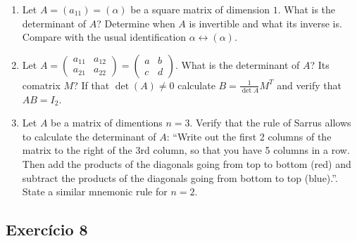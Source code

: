 \begin{enumerate}
\item Let $A = (a_{11}) = (\alpha)$ be a square matrix of dimension $1$.
  What is the determinant of $A$? Determine when $A$ is invertible and what
  its inverse is. Compare with the usual identification $\alpha \leftrightarrow
  (\alpha)$.
\item Let $A = \begin{pmatrix} a_{11} & a_{12} \\ a_{21} & a_{22} \end{pmatrix} =
  \begin{pmatrix} a & b \\ c & d \end{pmatrix}$.
  What is the determinant of $A$? Its comatrix $M$?
  If that $\det(A) \neq 0$ calculate $B= \frac{1}{\det{A}} M^T$ and verify
  that $AB = I_2$.
\item Let $A$ be a matrix of dimentions $n=3$. Verify that the rule of Sarrus
  allows to calculate the determinant of $A$:
  ``Write out the first 2 columns of the matrix to the right of the 3rd column,
  so that you have 5 columns in a row. Then add the products of the diagonals
  going from top to bottom (red) and subtract the products of the diagonals
  going from bottom to top (blue).''.
  State a similar mnemonic rule for $n=2$.

\begin{center}
\end{center}
\end{enumerate}

\subsection*{Exercício 8}

